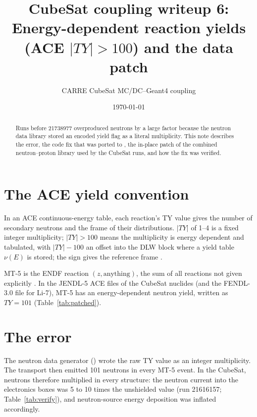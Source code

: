 

\title{CubeSat coupling writeup 6:\\Energy-dependent reaction yields (ACE $|TY|>100$) and the data patch}
\author{CARRE CubeSat MC/DC--Geant4 coupling}
\date{\today}


\maketitle

\begin{abstract}
Runs before 21738977 overproduced neutrons by a large factor because the neutron data library stored an encoded yield flag as a literal multiplicity. This note describes the error, the code fix that was ported to , the in-place patch of the combined neutron--proton library used by the CubeSat runs, and how the fix was verified.
\end{abstract}

\section{The ACE yield convention}
In an ACE continuous-energy table, each reaction's TY value gives the number of secondary neutrons and the frame of their distributions. $|TY|$ of 1--4 is a fixed integer multiplicity; $|TY|>100$ means the multiplicity is energy dependent and tabulated, with $|TY|-100$ an offset into the DLW block where a yield table $\nu(E)$ is stored; the sign gives the reference frame \citep{conlin2019ace}.

MT-5 is the ENDF reaction $(z,\text{anything})$, the sum of all reactions not given explicitly \citep{trkov2018endf6}. In the JENDL-5 \citep{iwamoto2023jendl5} ACE files of the CubeSat nuclides (and the FENDL-3.0 file for Li-7), MT-5 has an energy-dependent neutron yield, written as $TY=101$ (Table~\ref{tab:patched}).

\section{The error}
The \mcdc{} neutron data generator () wrote the raw TY value as an integer multiplicity. The transport then emitted 101 neutrons in every MT-5 event. In the CubeSat, neutrons therefore multiplied in every structure: the neutron current into the electronics boxes was 5 to 10 times the unshielded value (run 21616157; Table~\ref{tab:verify}), and neutron-source energy deposition was inflated accordingly.

